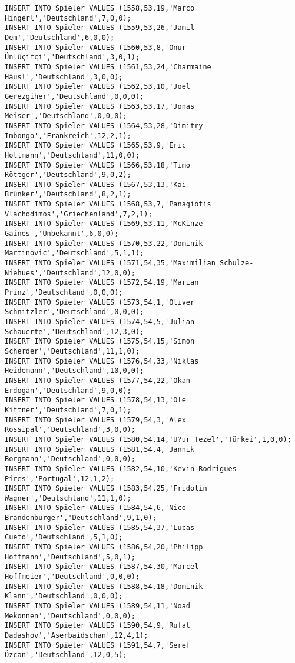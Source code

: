 \documentclass{lehramt-informatik-aufgabe}
\begin{document}
\begin{verbatim}
INSERT INTO Spieler VALUES (1558,53,19,'Marco Hingerl','Deutschland',7,0,0);
INSERT INTO Spieler VALUES (1559,53,26,'Jamil Dem','Deutschland',6,0,0);
INSERT INTO Spieler VALUES (1560,53,8,'Onur Ünlüçifçi','Deutschland',3,0,1);
INSERT INTO Spieler VALUES (1561,53,24,'Charmaine Häusl','Deutschland',3,0,0);
INSERT INTO Spieler VALUES (1562,53,10,'Joel Gerezgiher','Deutschland',0,0,0);
INSERT INTO Spieler VALUES (1563,53,17,'Jonas Meiser','Deutschland',0,0,0);
INSERT INTO Spieler VALUES (1564,53,28,'Dimitry Imbongo','Frankreich',12,2,1);
INSERT INTO Spieler VALUES (1565,53,9,'Eric Hottmann','Deutschland',11,0,0);
INSERT INTO Spieler VALUES (1566,53,18,'Timo Röttger','Deutschland',9,0,2);
INSERT INTO Spieler VALUES (1567,53,13,'Kai Brünker','Deutschland',8,2,1);
INSERT INTO Spieler VALUES (1568,53,7,'Panagiotis Vlachodimos','Griechenland',7,2,1);
INSERT INTO Spieler VALUES (1569,53,11,'McKinze Gaines','Unbekannt',6,0,0);
INSERT INTO Spieler VALUES (1570,53,22,'Dominik Martinovic','Deutschland',5,1,1);
INSERT INTO Spieler VALUES (1571,54,35,'Maximilian Schulze-Niehues','Deutschland',12,0,0);
INSERT INTO Spieler VALUES (1572,54,19,'Marian Prinz','Deutschland',0,0,0);
INSERT INTO Spieler VALUES (1573,54,1,'Oliver Schnitzler','Deutschland',0,0,0);
INSERT INTO Spieler VALUES (1574,54,5,'Julian Schauerte','Deutschland',12,3,0);
INSERT INTO Spieler VALUES (1575,54,15,'Simon Scherder','Deutschland',11,1,0);
INSERT INTO Spieler VALUES (1576,54,33,'Niklas Heidemann','Deutschland',10,0,0);
INSERT INTO Spieler VALUES (1577,54,22,'Okan Erdogan','Deutschland',9,0,0);
INSERT INTO Spieler VALUES (1578,54,13,'Ole Kittner','Deutschland',7,0,1);
INSERT INTO Spieler VALUES (1579,54,3,'Alex Rossipal','Deutschland',3,0,0);
INSERT INTO Spieler VALUES (1580,54,14,'U?ur Tezel','Türkei',1,0,0);
INSERT INTO Spieler VALUES (1581,54,4,'Jannik Borgmann','Deutschland',0,0,0);
INSERT INTO Spieler VALUES (1582,54,10,'Kevin Rodrigues Pires','Portugal',12,1,2);
INSERT INTO Spieler VALUES (1583,54,25,'Fridolin Wagner','Deutschland',11,1,0);
INSERT INTO Spieler VALUES (1584,54,6,'Nico Brandenburger','Deutschland',9,1,0);
INSERT INTO Spieler VALUES (1585,54,37,'Lucas Cueto','Deutschland',5,1,0);
INSERT INTO Spieler VALUES (1586,54,20,'Philipp Hoffmann','Deutschland',5,0,1);
INSERT INTO Spieler VALUES (1587,54,30,'Marcel Hoffmeier','Deutschland',0,0,0);
INSERT INTO Spieler VALUES (1588,54,18,'Dominik Klann','Deutschland',0,0,0);
INSERT INTO Spieler VALUES (1589,54,11,'Noad Mekonnen','Deutschland',0,0,0);
INSERT INTO Spieler VALUES (1590,54,9,'Rufat Dadashov','Aserbaidschan',12,4,1);
INSERT INTO Spieler VALUES (1591,54,7,'Seref Özcan','Deutschland',12,0,5);

\end{verbatim}
\end{document}
